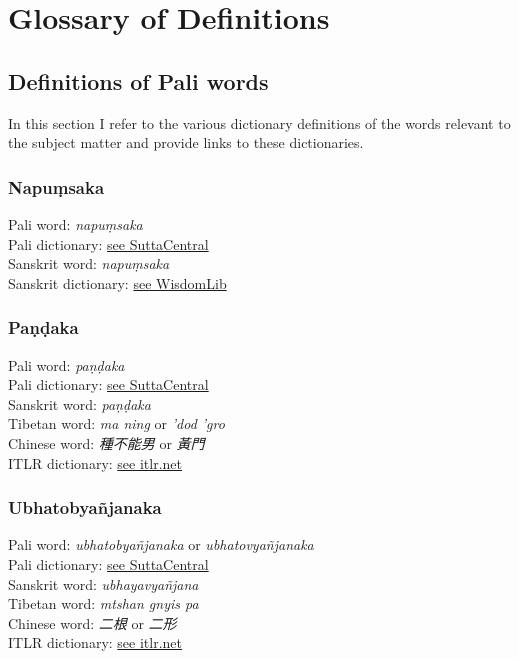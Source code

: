 \section{Glossary of Definitions}
\label{appendix3}

\subsection{Definitions of Pali words}
In this section I refer to the various dictionary definitions of the words relevant to the subject matter and provide links to these dictionaries.

\subsubsection{Napuṃsaka}
Pali word: {\em napuṃsaka} \\
Pali dictionary: \href{https://suttacentral.net/define/napu%E1%B9%83saka}{see SuttaCentral} \\
Sanskrit word: {\em napuṃsaka} \\
Sanskrit dictionary: \href{https://www.wisdomlib.org/definition/napumsaka}{see WisdomLib} \\

\subsubsection{Paṇḍaka}
Pali word: {\em paṇḍaka} \\
Pali dictionary: \href{https://suttacentral.net/define/pa%E1%B9%87%E1%B8%8Daka}{see SuttaCentral} \\
Sanskrit word: {\em paṇḍaka} \\
Tibetan word: {\em ma ning} or {\em ’dod ’gro} \\
Chinese word: {\em 種不能男} or {\em 黃門}\\
ITLR dictionary: \href{http://www.itlr.net/hwid:281142}{see itlr.net} \\

\subsubsection{Ubhatob­yañ­janaka}
Pali word: {\em ubhatob­yañ­janaka} or {\em ubhatovyañ­janaka} \\
Pali dictionary: \href{https://suttacentral.net/define/ubhatovya%C3%B1janaka}{see SuttaCentral} \\
Sanskrit word: {\em ubhayavyañjana} \\
Tibetan word: {\em mtshan gnyis pa} \\
Chinese word: {\em 二根} or {\em 二形}\\
ITLR dictionary: \href{http://www.itlr.net/hwid:62844}{see itlr.net} \\

